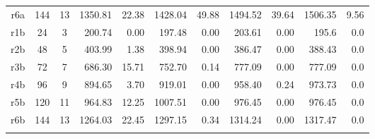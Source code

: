 \begin{landscape}
\begin{table}[]
\begin{tabular}{cllrrrrrrrr}
  r6a                  & \multicolumn{1}{c}{144}  & \multicolumn{1}{c}{13}   & 1350.81                       & 22.38                         & 1428.04                        & 49.88                        & 1494.52                        & 39.64                         & 1506.35                        & 9.56                         \\
  r1b                  & \multicolumn{1}{c}{24}  & \multicolumn{1}{c}{3}   & 200.74                       & 0.00                      & 197.48                       & 0.00                        & 203.61                        & 0.00                       & 195.6                        & 0.0
                           \\
  r2b                  & \multicolumn{1}{c}{48}  & \multicolumn{1}{c}{5}   & 403.99                        & 1.38                         & 398.94                        & 0.00                        & 386.47                        & 0.00                        & 388.43                        & 0.0                         \\
  r3b                  & \multicolumn{1}{c}{72}  & \multicolumn{1}{c}{7}   & 686.30                & 15.71                        & 752.70                        & 0.14                         & 777.09                        & 0.00                        & 777.09                        & 0.0                         \\
  r4b                  & \multicolumn{1}{c}{96}  & \multicolumn{1}{c}{9}   & 894.65                     & 3.70                    & 919.01                        & 0.00                        & 958.40                        & 0.24                         & 973.73                        & 0.0                         \\
  r5b                  & \multicolumn{1}{c}{120}  & \multicolumn{1}{c}{11}   & 964.83                      & 12.25                         & 1007.51                        & 0.00                       & 976.45                        & 0.00                        & 976.45                       & 0.0                         \\
  r6b                  & \multicolumn{1}{c}{144}  & \multicolumn{1}{c}{13}   & 1264.03                     & 22.45                        & 1297.15                       & 0.34                         & 1314.24                        & 0.00                        & 1317.47                        & 0.0                         \\
                       &                         &                         &                           &                           &                           &                           &                           &                           &                           &                           \\

\end{tabular}
\end{table}
\end{landscape}
